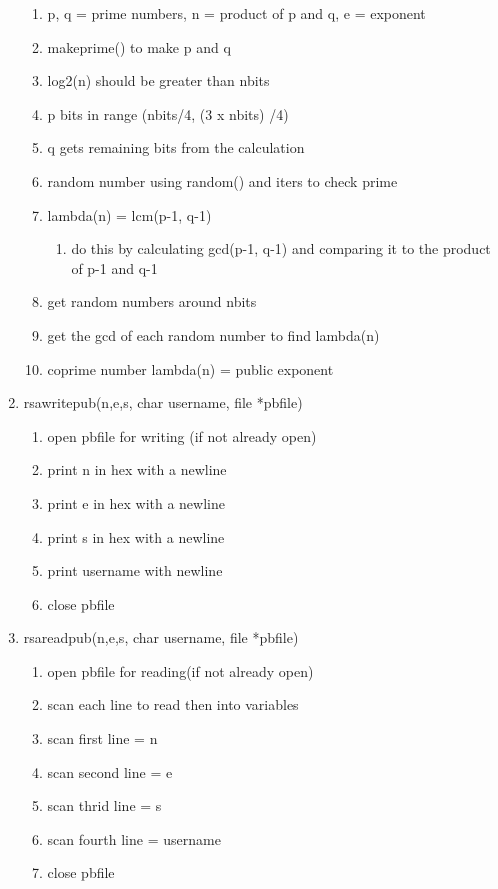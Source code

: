 \documentclass[11pt]{article}
\begin{document}
\begin{enumerate}
	\begin{enumerate}
	\item p, q = prime numbers, n = product of p and q, e = exponent
	\item makeprime() to make p and q
	\item log2(n) should be greater than nbits
	\item p bits in range (nbits/4, (3 x nbits) /4)
	\item q gets remaining bits from the calculation
	\item random number using random() and iters to check prime
	\item lambda(n) = lcm(p-1, q-1)
		\begin{enumerate}
		\item do this by calculating gcd(p-1, q-1) and comparing it to the product of p-1 and q-1
		\end{enumerate}
	\item get random numbers around nbits
	\item get the gcd of each random number to find lambda(n)
	\item coprime number lambda(n) = public exponent
	\end{enumerate}
\item rsawritepub(n,e,s, char username, file *pbfile)
	\begin{enumerate}
	\item open pbfile for writing (if not already open)
	\item print n in hex with a newline
	\item print e in hex with a newline
	\item print s in hex with a newline
	\item print username with newline
	\item close pbfile
	\end{enumerate}
\item rsareadpub(n,e,s, char username, file *pbfile)
	\begin{enumerate}
	\item open pbfile for reading(if not already open)
	\item scan each line to read then into variables
	\item scan first line = n
	\item scan second line = e
	\item scan thrid line = s
	\item scan fourth line = username
	\item close pbfile
	\end{enumerate}

\end{enumerate}
\end{document}
